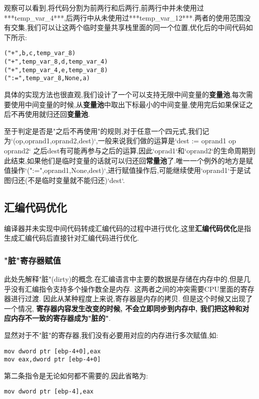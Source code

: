 \documentclass{article}
\begin{document}
观察可以看到,将代码分割为前两行和后两行,前两行中并未使用过***temp\_var\_4***,后两行中从未使用过***temp\_var\_12***.两者的使用范围没有交集,我们可以让这两个临时变量共享栈里面的同一个位置,优化后的中间代码如下所示:

\begin{verbatim}
("+",b,c,temp_var_8)
("+",temp_var_8,d,temp_var_4)
("+",temp_var_4,e,temp_var_8)
(":=",temp_var_8,None,a)
\end{verbatim}

具体的实现方法也很直观,我们设计了一个可以支持无限中间变量的\textbf{变量池},每次需要使用中间变量的时候,从\textbf{变量池}中取出下标最小的中间变量,使用完后如果保证之后不再使用就归还回\textbf{变量池}.


至于判定是否是"之后不再使用"的规则,对于任意一个四元式,我们记为`(op,oprand1,oprand2,dest)`,一般来说我们做的运算是`dest := oprand1 op oprand2` 之后dest有可能再参与之后的运算,因此`oprad1`和`oprand2`的生命周期到此结束,如果他们是临时变量的话就可以归还回\textbf{常量池}了.唯一一个例外的地方是赋值操作`(":=",oprand1,None,dest)`,进行赋值操作后,可能继续使用`oprand1`于是试图归还(不是临时变量就不能归还)`dest`.

\subsection{汇编代码优化}

编译器并未实现中间代码转成汇编代码的过程中进行优化,这里\textbf{汇编代码优化}是指生成汇编代码后直接针对汇编代码进行优化.

\subsubsection{"脏"寄存器赋值}

此处先解释"脏"(dirty)的概念.在汇编语言中主要的数据是存储在内存中的,但是几乎没有汇编指令支持多个操作数全是内存. 这两者之间的冲突需要CPU里面的寄存器进行过渡. 因此从某种程度上来说,寄存器是内存的拷贝. 但是这个时候又出现了一个情况, \textbf{寄存器内容发生改变的时候, 不会立即同步到内存中, 我们把这种和对应内存不一致的寄存器成为"脏的"}.


显然对于不"脏"的寄存器,我们没有必要用对应的内存进行多次赋值,如:

\begin{verbatim}
mov dword ptr [ebp-4+0],eax
mov eax,dword ptr [ebp-4+0]
\end{verbatim}

第二条指令是无论如何都不需要的,因此省略为:

\begin{verbatim}
mov dword ptr [ebp-4],eax
\end{verbatim}
\end{document}
